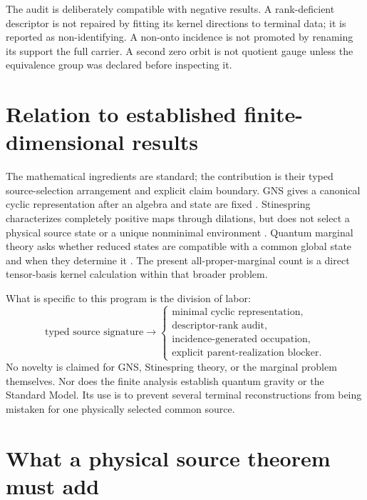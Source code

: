 \documentclass[11pt]{article}
\begin{document}
The audit is deliberately compatible with negative results.  A rank-deficient
descriptor is not repaired by fitting its kernel directions to terminal data;
it is reported as non-identifying.  A non-onto incidence is not promoted by
renaming its support the full carrier.  A second zero orbit is not quotient
gauge unless the equivalence group was declared before inspecting it.

\section{Relation to established finite-dimensional results}

The mathematical ingredients are standard; the contribution is their typed
source-selection arrangement and explicit claim boundary.  GNS gives a
canonical cyclic representation after an algebra and state are fixed
\cite{Segal1947}.  Stinespring characterizes completely positive maps through
dilations, but does not select a physical source state or a unique
nonminimal environment \cite{Stinespring1955}.  Quantum marginal theory asks
whether reduced states are compatible with a common global state and when
they determine it \cite{Klyachko2006,Bravyi2004,
LindenPopescuWootters2002}.  The present all-proper-marginal count is a direct
tensor-basis kernel calculation within that broader problem.

What is specific to this program is the division of labor:
\begin{equation}
 \text{typed source signature}
 \longrightarrow
 \begin{cases}
  \text{minimal cyclic representation},\\
  \text{descriptor-rank audit},\\
  \text{incidence-generated occupation},\\
  \text{explicit parent-realization blocker}.
 \end{cases}
 \label{eq:division-of-labor}
\end{equation}
No novelty is claimed for GNS, Stinespring theory, or the marginal problem
themselves.  Nor does the finite analysis establish quantum gravity or the
Standard Model.  Its use is to prevent several terminal reconstructions from
being mistaken for one physically selected common source.

\section{What a physical source theorem must add}
\end{document}
